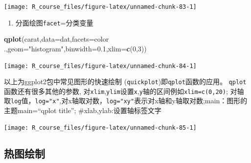 \documentclass[]{article}
\newenvironment{Shaded}{\begin{snugshade}}{\end{snugshade}}
\newcommand{\KeywordTok}[1]{\textcolor[rgb]{0.13,0.29,0.53}{\textbf{{#1}}}}
\newcommand{\DataTypeTok}[1]{\textcolor[rgb]{0.13,0.29,0.53}{{#1}}}
\newcommand{\DecValTok}[1]{\textcolor[rgb]{0.00,0.00,0.81}{{#1}}}
\newcommand{\FloatTok}[1]{\textcolor[rgb]{0.00,0.00,0.81}{{#1}}}
\newcommand{\StringTok}[1]{\textcolor[rgb]{0.31,0.60,0.02}{{#1}}}
\newcommand{\NormalTok}[1]{{#1}}
\providecommand{\tightlist}{%
  \setlength{\itemsep}{0pt}\setlength{\parskip}{0pt}}
\numberwithin{figure}{section}
\numberwithin{table}{section}
\theoremstyle{definition}
\theoremstyle{definition}
\theoremstyle{definition}
\theoremstyle{remark}
\begin{document}
\begin{center}\texttt{[image: R\_course\_files/figure-latex/unnamed-chunk-83-1]} \end{center}

\begin{enumerate}
\def\labelenumi{\arabic{enumi}.}
\setcounter{enumi}{6}
\tightlist
\item
  分面绘图\texttt{facet}=分类变量
\end{enumerate}

\begin{Shaded}
\begin{Highlighting}[]
\KeywordTok{qplot}\NormalTok{(carat,}\DataTypeTok{data=}\NormalTok{dat,}\DataTypeTok{facets=}\NormalTok{color ~}\StringTok{ }\NormalTok{.,}\DataTypeTok{geom=}\StringTok{"histogram"}\NormalTok{,}\DataTypeTok{binwidth=}\FloatTok{0.1}\NormalTok{,}\DataTypeTok{xlim=}\KeywordTok{c}\NormalTok{(}\DecValTok{0}\NormalTok{,}\DecValTok{3}\NormalTok{))}
\end{Highlighting}
\end{Shaded}

\begin{center}\texttt{[image: R\_course\_files/figure-latex/unnamed-chunk-84-1]} \end{center}

以上为ggplot2包中常见图形的快速绘制
(\texttt{quickplot})即\texttt{qplot}函数的应用。
\texttt{qplot}函数还有很多其他的参数,
对\texttt{xlim},\texttt{ylim}设置\texttt{x},\texttt{y}轴的区间例如\texttt{xlim=c(0,20)};
对轴取\texttt{log}值，\texttt{log="x"},对x轴取对数，\texttt{log="xy"}表示对x轴和y轴取对数;main：图形的主题main=``qplot
title''; \#xlab,ylab:设置轴标签文字

\begin{Shaded}
\end{Shaded}

\begin{center}\texttt{[image: R\_course\_files/figure-latex/unnamed-chunk-85-1]} \end{center}

\subsection{热图绘制}
\end{document}
